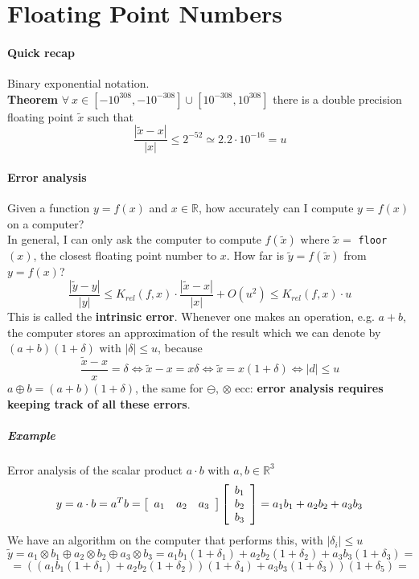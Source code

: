 \documentclass[10pt]{report}
\begin{document}
\section{Floating Point Numbers}
\paragraph{Quick recap} Binary exponential notation.\\
\textbf{Theorem} $\forall\:x\in[-10^{308},-10^{-308}]\cup[10^{-308},10^{308}]$ there is a double precision floating point $\tilde{x}$ such that $$\frac{|\tilde{x} - x|}{|x|}\leq 2^{-52} \simeq 2.2\cdot10^{-16}=u$$
\paragraph{Error analysis} Given a function $y = f(x)$ and $x\in \mathbb{R}$, how accurately can I compute $y=f(x)$ on a computer?\\
In general, I can only ask the computer to compute $f(\tilde{x})$ where $\tilde{x} =$ \texttt{floor}$(x)$, the closest floating point number to $x$. How far is $\tilde{y}=f(\tilde{x})$ from $y=f(x)$?
$$\frac{|\tilde{y}-y|}{|y|}\leq K_{rel}(f,x)\cdot\frac{|\tilde{x}-x|}{|x|} + O(u^2)\leq K_{rel}(f,x)\cdot u$$
This is called the \textbf{intrinsic error}. Whenever one makes an operation, e.g. $a+b$, the computer stores an approximation of the result which we can denote by $(a+b)(1+\delta)$ with $|\delta|\leq u$, because $$\frac{\tilde{x}-x}{x} = \delta \Leftrightarrow \tilde{x} - x = x\delta \Leftrightarrow \tilde{x} = x(1+\delta) \Leftrightarrow |d|\leq u$$
$a\oplus b = (a+b)(1+\delta)$, the same for $\ominus$, $\otimes$ ecc: \textbf{error analysis requires keeping track of all these errors}.
\subparagraph{Example} Error analysis of the scalar product $a\cdot b$ with $a,b \in \mathbb{R}^3$
$$y = a\cdot b = a^Tb = \left[\begin{array}{c c c}
a_1 & a_2 & a_3
\end{array}\right] \left[\begin{array}{c}
b_1\\b_2\\b_3
\end{array}\right]=a_1b_1+a_2b_2+a_3b_3$$
We have an algorithm on the computer that performs this, with $|\delta_i|\leq u$ $$\tilde{y} = a_1\otimes b_1\oplus a_2\otimes b_2\oplus a_3\otimes b_3 = a_1b_1(1+\delta_1)+a_2b_2(1+\delta_2)+a_3b_3(1+\delta_3) = $$
$$ = \left((a_1b_1(1+\delta_1) + a_2b_2(1+\delta_2)) (1+\delta_4) + a_3b_3(1+\delta_3)\right)(1+\delta_5) =$$
\end{document}
